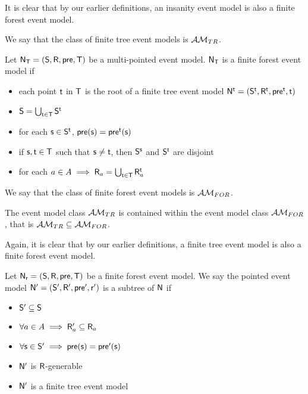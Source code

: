 It is clear that by our earlier definitions, an insanity event model is also a finite forest event
model.

We say that the class of finite tree event models is $\treeClass$.

\begin{defn} \label{forest}
Let $\evM_\evT = (\evS, \evR, \evpr, \evT)$ be a multi-pointed event model.
$\evM_\evT$ is a finite forest event model if
\begin{itemize}
	\item each point $\evt$ in $\evT$ is the root of a finite tree event model $\evM^\evt =
	(\evS^\evt, \evR^\evt,
	\evpr^\evt, \evt)$
  \item $\evS = \bigcup_{\evt \in \evT} \evS^\evt$
	\item for each $\evs \in \evS^\evt$, $\evpr(\evs) = \evpr^\evt(\evs)$
	\item if $\evs, \evt \in \evT$ such that $\evs \neq \evt$, then $\evS^\evs$ and $\evS^\evt$ are disjoint
  \item for each $a \in A \implies \evR_a = \bigcup_{\evt \in \evT} \evR_a^\evt$
\end{itemize}
\end{defn}

We say that the class of finite forest event models is $\forestClass$.

\begin{lemma} \label{treeIsForest}
The event model class $\treeClass$ is contained within the event model class
$\forestClass$, that is $\treeClass \subseteq \forestClass$.
\end{lemma}

Again, it is clear that by our earlier definitions, a finite tree event model is also a finite forest event
model.

\begin{defn} \label{subtree}
Let $\evM_\evr = (\evS, \evR, \evpr, \evT)$ be a finite forest event model.
We say the pointed event model $\evM' = (\evS', \evR', \evpr', \evr')$ is a subtree of $\evM$ if
\begin{itemize}
	\item $\evS' \subseteq \evS$
	\item $\forall a \in A \implies \evR_a' \subseteq \evR_a$
	\item $\forall \evs \in \evS' \implies \evpr(\evs) = \evpr'(\evs) $
	\item $\evM'$ is $\evR$-generable
	\item $\evM'$ is a finite tree event model
\end{itemize}
\end{defn}


